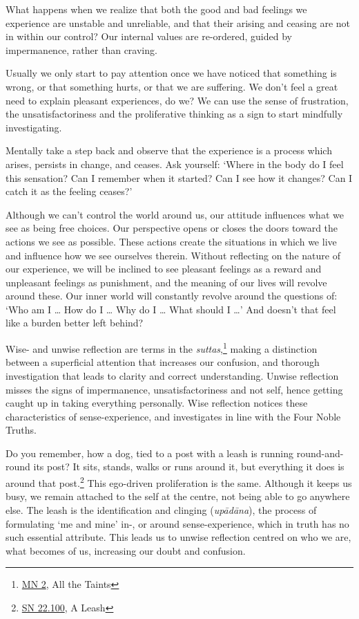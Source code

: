 What happens when we realize that both the good and bad feelings we
experience are unstable and unreliable, and that their arising and
ceasing are not in within our control? Our internal values are
re-ordered, guided by impermanence, rather than craving.


Usually we only start to pay attention once we have noticed that
something is wrong, or that something hurts, or that we are suffering.
We don't feel a great need to explain pleasant experiences, do we? We
can use the sense of frustration, the unsatisfactoriness and the
proliferative thinking as a sign to start mindfully investigating.

Mentally take a step back and observe that the experience is a process
which arises, persists in change, and ceases. Ask yourself: `Where in
the body do I feel this sensation? Can I remember when it started? Can I
see how it changes? Can I catch it as the feeling ceases?'

Although we can't control the world around us, our attitude influences
what we see as being free choices. Our perspective opens or closes the
doors toward the actions we see as possible. These actions create the
situations in which we live and influence how we see ourselves therein.
Without reflecting on the nature of our experience, we will be inclined
to see pleasant feelings as a reward and unpleasant feelings as
punishment, and the meaning of our lives will revolve around these. Our
inner world will constantly revolve around the questions of: `Who am I
\ldots{} How do I \ldots{} Why do I \ldots{} What should I \ldots{}' And
doesn't that feel like a burden better left behind?

Wise- and unwise reflection are terms in the \emph{suttas},\footnote{\href{https://suttacentral.net/mn2/en/bodhi}{MN
  2}, All the Taints} making a distinction between a superficial
attention that increases our confusion, and thorough investigation that
leads to clarity and correct understanding. Unwise reflection misses the
signs of impermanence, unsatisfactoriness and not self, hence getting
caught up in taking everything personally. Wise reflection notices these
characteristics of sense-experience, and investigates in line with the
Four Noble Truths.


Do you remember, how a dog, tied to a post with a leash is running
round-and-round its post? It sits, stands, walks or runs around it, but
everything it does is around that post.\footnote{\href{https://suttacentral.net/sn22.100}{SN
  22.100}, A Leash} This ego-driven proliferation is the same. Although
it keeps us busy, we remain attached to the self at the centre, not
being able to go anywhere else. The leash is the identification and
clinging (\emph{upādāna}), the process of formulating `me and mine' in-,
or around sense-experience, which in truth has no such essential
attribute. This leads us to unwise reflection centred on who we are,
what becomes of us, increasing our doubt and confusion.

